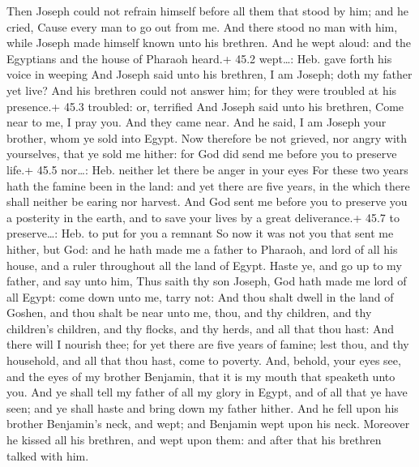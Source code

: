  Then Joseph could not refrain himself before all them that
stood by him; and he cried, Cause every man to go out from me. And there
stood no man with him, while Joseph made himself known unto his
brethren.  And he wept aloud: and the Egyptians and the
house of Pharaoh heard.+ 45.2 wept\ldots: Heb. gave forth his voice in
weeping  And Joseph said unto his brethren, I am Joseph;
doth my father yet live? And his brethren could not answer him; for they
were troubled at his presence.+ 45.3 troubled: or, terrified
 And Joseph said unto his brethren, Come near to me, I pray
you. And they came near. And he said, I am Joseph your brother, whom ye
sold into Egypt.  Now therefore be not grieved, nor angry
with yourselves, that ye sold me hither: for God did send me before you
to preserve life.+ 45.5 nor\ldots: Heb. neither let there be anger in
your eyes  For these two years hath the famine been in the
land: and yet there are five years, in the which there shall neither be
earing nor harvest.  And God sent me before you to preserve
you a posterity in the earth, and to save your lives by a great
deliverance.+ 45.7 to preserve\ldots: Heb. to put for you a remnant
 So now it was not you that sent me hither, but God: and he
hath made me a father to Pharaoh, and lord of all his house, and a ruler
throughout all the land of Egypt.  Haste ye, and go up to my
father, and say unto him, Thus saith thy son Joseph, God hath made me
lord of all Egypt: come down unto me, tarry not:  And thou
shalt dwell in the land of Goshen, and thou shalt be near unto me, thou,
and thy children, and thy children's children, and thy flocks, and thy
herds, and all that thou hast:  And there will I nourish
thee; for yet there are five years of famine; lest thou, and thy
household, and all that thou hast, come to poverty.  And,
behold, your eyes see, and the eyes of my brother Benjamin, that it is
my mouth that speaketh unto you.  And ye shall tell my
father of all my glory in Egypt, and of all that ye have seen; and ye
shall haste and bring down my father hither.  And he fell
upon his brother Benjamin's neck, and wept; and Benjamin wept upon his
neck.  Moreover he kissed all his brethren, and wept upon
them: and after that his brethren talked with him.

